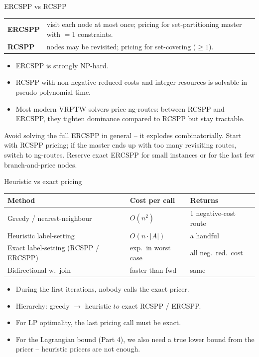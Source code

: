 \documentclass[10pt,aspectratio=169]{beamer}
\begin{document}
\begin{frame}{ERCSPP vs RCSPP}
  \begin{tabular}{@{}p{}p{}@{}}
    \toprule
    \textbf{ERCSPP} & visit each node \alert{at most once}; pricing for
                      set-partitioning master with $=1$ constraints. \\
    \textbf{RCSPP}  & nodes may be revisited; pricing for
                      set-covering ($\ge 1$). \\
    \bottomrule
  \end{tabular}
  \medskip
  \begin{itemize}\small
    \item ERCSPP is \alert{strongly} NP-hard.
    \item RCSPP with non-negative reduced costs and \alert{integer}
          resources is solvable in pseudo-polynomial time.
    \item Most modern VRPTW solvers price ng-routes: between RCSPP and ERCSPP,
          they tighten dominance compared to RCSPP but stay tractable.
  \end{itemize}

  \begin{keybox}
    Avoid solving the full \alert{ERCSPP} in general -- it explodes
    combinatorially. Start with \alert{RCSPP} pricing; if the master ends up
    with too many revisiting routes, switch to ng-routes. Reserve exact
    ERCSPP for small instances or for the last few branch-and-price nodes.
  \end{keybox}
\end{frame}

\begin{frame}{Heuristic vs exact pricing}
  \begin{tabular}{@{}lll@{}}
    \toprule
    Method & Cost per call & Returns \\
    \midrule
    Greedy / nearest-neighbour & $O(n^2)$ & 1 negative-cost route \\
    Heuristic label-setting & $O(n\cdot|A|)$ & a handful \\
    Exact label-setting (RCSPP / ERCSPP) & exp.\ in worst case & all neg.\ red.\ cost \\
    Bidirectional w.\ join & faster than fwd & same \\
    \bottomrule
  \end{tabular}
  \medskip
  \begin{itemize}\small
    \item During the first iterations, nobody calls the exact pricer.
    \item Hierarchy: greedy $\to$ heuristic $to$ exact RCSPP / ERCSPP.
    \item For LP optimality, the \alert{last} pricing call must be exact.
    \item For the Lagrangian bound (Part 4), we also need a true lower bound
          from the pricer -- heuristic pricers are not enough.
  \end{itemize}
\end{frame}
\end{document}
